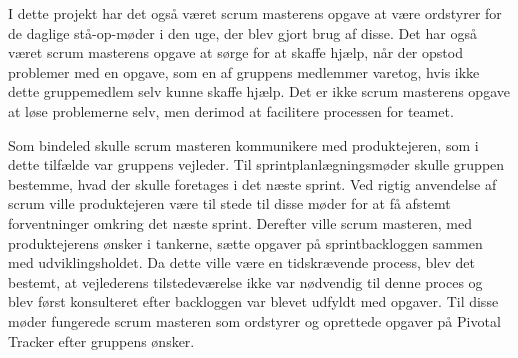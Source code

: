 

I dette projekt har det også været scrum masterens opgave at være ordstyrer for de daglige stå-op-møder i den uge, der blev gjort brug af disse. Det har også været scrum masterens opgave at sørge for at skaffe hjælp, når der opstod problemer med en opgave, som en af gruppens medlemmer varetog, hvis ikke dette gruppemedlem selv kunne skaffe hjælp. Det er ikke scrum masterens opgave at løse problemerne selv, men derimod at facilitere processen for teamet. 


Som bindeled skulle scrum masteren kommunikere med produktejeren, som i dette tilfælde var gruppens vejleder. Til sprintplanlægningsmøder skulle gruppen bestemme, hvad der skulle foretages i det næste sprint. Ved rigtig anvendelse af scrum ville produktejeren være til stede til disse møder for at få afstemt forventninger omkring det næste sprint. Derefter ville scrum masteren, med produktejerens ønsker i tankerne, sætte opgaver på sprintbackloggen sammen med udviklingsholdet. Da dette ville være en tidskrævende process, blev det bestemt, at vejlederens tilstedeværelse ikke var nødvendig til denne proces og blev først konsulteret efter backloggen var blevet udfyldt med opgaver. Til disse møder fungerede scrum masteren som ordstyrer og oprettede opgaver på Pivotal Tracker efter gruppens ønsker. \par 

